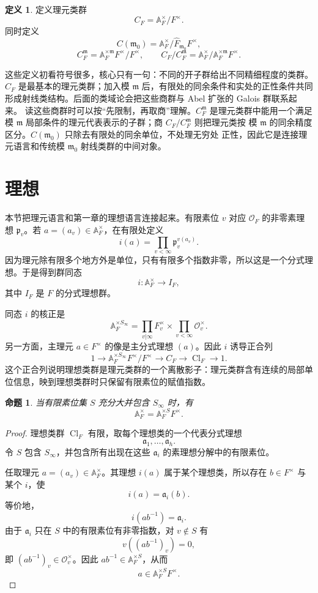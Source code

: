 \documentclass[11pt,a4paper,openany]{ctexbook}
\numberwithin{equation}{chapter}
\newcommand{\A}{\mathbb{A}}
\newcommand{\Cl}{\operatorname{Cl}}
\theoremstyle{plain}
\newtheorem{proposition}[theorem]{命题}
\theoremstyle{definition}
\newtheorem{definition}[theorem]{定义}
\theoremstyle{remark}
\begin{document}
\begin{definition}
定义理元类群
\[
 C_F=\A_F^\times/F^\times.
\]
同时定义
\[
 C(\mathfrak m_0)=\A_F^\times/\widehat F_{\mathfrak m_0}F^\times,
\]
\[
 C_F^{\mathfrak m}=\A_F^{\times\mathfrak m}F^\times/F^\times,
\qquad
 C_F/C_F^{\mathfrak m}
 =\A_F^\times/\A_F^{\times\mathfrak m}F^\times.
\]
\end{definition}

这些定义初看符号很多，核心只有一句：不同的开子群给出不同精细程度的类群。$C_F$ 是最基本的理元类群；加入模 $\mathfrak m$ 后，有限处的同余条件和实处的正性条件共同形成射线类结构。后面的类域论会把这些商群与 Abel 扩张的 Galois 群联系起来。
读这些商群时可以按“先限制，再取商”理解。$C_F^{\mathfrak m}$ 是理元类群中能用一个满足
模 $\mathfrak m$ 局部条件的理元代表表示的子群；商 $C_F/C_F^{\mathfrak m}$ 则把理元类按
模 $\mathfrak m$ 的同余精度区分。$C(\mathfrak m_0)$ 只除去有限处的同余单位，不处理无穷处
正性，因此它是连接理元语言和传统模 $\mathfrak m_0$ 射线类群的中间对象。

\section{理想}

本节把理元语言和第一章的理想语言连接起来。有限素位 $v$ 对应 $\mathcal O_F$ 的非零素理想 $\mathfrak p_v$。若 $a=(a_v)\in\A_F^\times$，在有限处定义
\[
 i(a)=\prod_{v<\infty}\mathfrak p_v^{v(a_v)}.
\]
因为理元除有限多个地方外是单位，只有有限多个指数非零，所以这是一个分式理想。于是得到群同态
\[
 i:\A_F^\times\longrightarrow I_F,
\]
其中 $I_F$ 是 $F$ 的分式理想群。

同态 $i$ 的核正是
\[
 \A_F^{\times S_\infty}
 =\prod_{v|\infty}F_v^\times\times\prod_{v<\infty}\mathcal O_v^\times.
\]
另一方面，主理元 $a\in F^\times$ 的像是主分式理想 $(a)$。因此 $i$ 诱导正合列
\[
 1\longrightarrow
 \A_F^{\times S_\infty}F^\times/F^\times
 \longrightarrow C_F
 \longrightarrow \Cl_F
 \longrightarrow1.
\]
这个正合列说明理想类群是理元类群的一个离散影子：理元类群含有连续的局部单位信息，映到理想类群时只保留有限素位的赋值指数。

\begin{proposition}
当有限素位集 $S$ 充分大并包含 $S_\infty$ 时，有
\[
 \A_F^\times=\A_F^{\times S}F^\times.
\]
\end{proposition}

\begin{proof}
理想类群 $\Cl_F$ 有限，取每个理想类的一个代表分式理想
\[
 \mathfrak a_1,\ldots,\mathfrak a_h.
\]
令 $S$ 包含 $S_\infty$，并包含所有出现在这些 $\mathfrak a_i$ 的素理想分解中的有限素位。

任取理元 $a=(a_v)\in\A_F^\times$。其理想 $i(a)$ 属于某个理想类，所以存在 $b\in F^\times$ 与某个 $i$，使
\[
 i(a)=\mathfrak a_i(b).
\]
等价地，
\[
 i(ab^{-1})=\mathfrak a_i.
\]
由于 $\mathfrak a_i$ 只在 $S$ 中的有限素位有非零指数，对 $v\notin S$ 有
\[
 v((ab^{-1})_v)=0,
\]
即 $(ab^{-1})_v\in\mathcal O_v^\times$。因此 $ab^{-1}\in\A_F^{\times S}$，从而
\[
 a\in \A_F^{\times S}F^\times.
\]
\end{proof}
\end{document}
